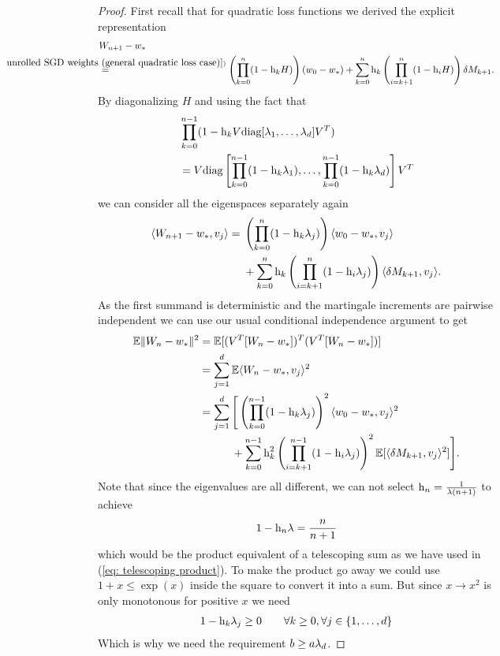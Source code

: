 \begin{proof}
	First recall that for quadratic loss functions we derived the explicit
	representation
	\begin{align*}
	&\Weights_{n+1}-\minimum\\
	&\lxeq{(\ref{eq: unrolled SGD weights (general quadratic loss case)})}
	\left(\prod_{k=0}^n(1-\lr_kH)\right)(\weights_0-\minimum)
	+ \sum_{k=0}^n\lr_k\left(\prod_{i=k+1}^n(1-\lr_iH)\right)\martIncr_{k+1}.
	\end{align*}
	By diagonalizing \(H\) and using the fact that
	\begin{align*}
		&\prod_{k=0}^{n-1} (1-\text{h}_k V\text{diag}[\lambda_1, \dots, \lambda_d]V^T)\\
		&= V \text{diag}\left[
			\prod_{k=0}^{n-1}(1-\text{h}_k\lambda_1),
			\dots, \prod_{k=0}^{n-1}(1-\text{h}_k\lambda_d)
		\right]V^T
	\end{align*}
	we can consider all the eigenspaces separately again
	\begin{align*}
		\langle W_{n+1}-w_*, v_j \rangle
		= \begin{aligned}[t]
			&\left(\prod_{k=0}^n(1-\text{h}_k\lambda_j)\right) \langle w_0-w_*, v_j\rangle\\
			&+ \sum_{k=0}^n \text{h}_k \left(\prod_{i=k+1}^n(1-\text{h}_i\lambda_j)\right)\langle\delta M_{k+1},v_j\rangle.
		\end{aligned}
	\end{align*}
	As the first summand is deterministic and the martingale increments are
	pairwise independent we can use our usual conditional independence argument
	to get
	\begin{align*}
		\mathbb{E}\|W_n-w_*\|^2
		&= \mathbb{E}[(V^T [W_n-w_*])^T(V^T[W_n-w_*])]\\
		&= \sum_{j=1}^d \mathbb{E}\langle W_n-w_*, v_j \rangle^2\\
		&= \sum_{j=1}^d
		\begin{aligned}[t]
			&\Bigg[\left(\prod_{k=0}^{n-1}(1-\text{h}_k\lambda_j)\right)^2 \langle w_0-w_*, v_j\rangle^2\\
			&+ \sum_{k=0}^{n-1} \text{h}_k^2 \left(\prod_{i=k+1}^{n-1}(1-\text{h}_i\lambda_j)\right)^2\mathbb{E}[\langle\delta M_{k+1},v_j\rangle^2]\Bigg].
		\end{aligned}
	\end{align*}
	Note that since the eigenvalues are all different, we can not select \(\text{h}_n=\frac{1}{\lambda(n+1)}\)
	to achieve
	\begin{align*}
		1-\text{h}_n\lambda = \frac{n}{n+1}
	\end{align*}
	which would be the product equivalent of a telescoping sum as we have used in
	(\ref{eq: telescoping product}). To make the product go away we could use
	\(1+x\le \exp(x)\) inside the square to convert it into a sum. But since \(x\to
	x^2\) is only monotonous for positive \(x\) we need
	\begin{align*}
		1-\text{h}_k \lambda_j \ge 0 \qquad \forall k\ge 0, \forall j \in\{1,\dots,d\}
	\end{align*}
	Which is why we need the requirement \(b\ge a\lambda_d\).


\end{proof}
